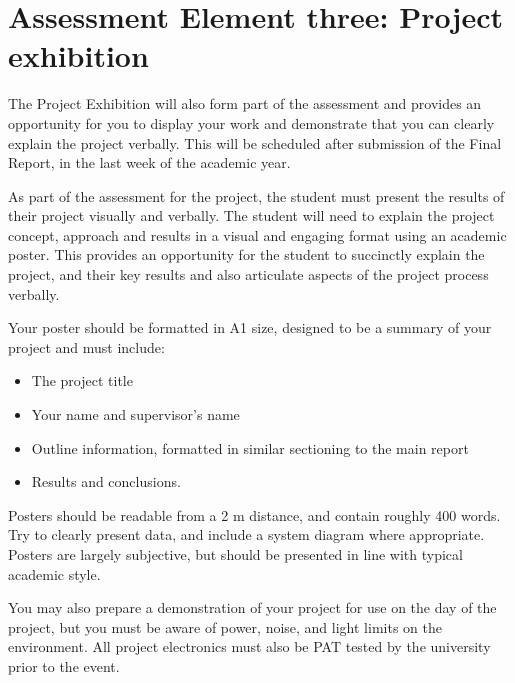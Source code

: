 \section{Assessment Element three: Project exhibition}

The Project Exhibition will also form part of the assessment and provides an opportunity for you to display your work and demonstrate that you can clearly explain the project verbally. This will be scheduled after submission of the Final Report, in the last week of the academic year.

As part of the assessment for the project, the student must present the results of their project visually and verbally. The student will need to explain the project concept, approach and results in a visual and engaging format using an academic poster. This provides an opportunity for the student to succinctly explain the project, and their key results and also articulate aspects of the project process verbally.

Your poster should be formatted in A1 size, designed to be a summary of your project and must include:

\begin{itemize}
    \item The project title
    \item Your name and supervisor's name
    \item Outline information, formatted in similar sectioning to the main report
    \item Results and conclusions.
\end{itemize}

Posters should be readable from a 2 m distance, and contain roughly 400 words. Try to clearly present data, and include a system diagram where appropriate. Posters are largely subjective, but should be presented in line with typical academic style.

You may also prepare a demonstration of your project for use on the day of the project, but you must be aware of power, noise, and light limits on the environment. All project electronics must also be PAT tested by the university prior to the event.